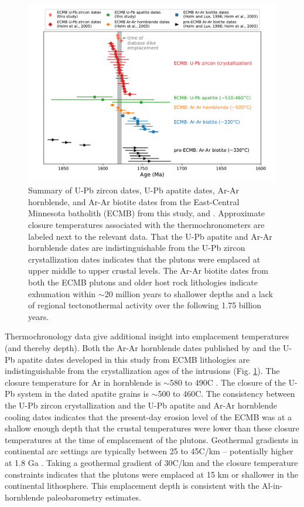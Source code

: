 \documentclass[draft]{agujournal2019}
\begin{document}
\begin{figure}[!ht]
\centering
\noindent\includegraphics[width=\textwidth]{./figures/ECMB_dates_thermochron.pdf}
\caption{\small{Summary of U-Pb zircon dates, U-Pb apatite dates, Ar-Ar hornblende, and Ar-Ar biotite dates from the East-Central Minnesota batholith (ECMB) from this study,  and . Approximate closure temperatures associated with the thermochronometers are labeled next to the relevant data. That the U-Pb apatite and Ar-Ar hornblende dates are indistinguishable from the U-Pb zircon crystallization dates indicates that the plutons were emplaced at upper middle to upper crustal levels. The Ar-Ar biotite dates from both the ECMB plutons and older host rock lithologies indicate exhumation within $\sim$20 million years to shallower depths and a lack of regional tectonothermal activity over the following 1.75 billion years.}}
\label{fig:thermochron_dates}
\end{figure}

Thermochronology data give additional insight into emplacement temperatures (and thereby depth). Both the Ar-Ar hornblende dates published by  and the U-Pb apatite dates developed in this study from ECMB lithologies are indistinguishable from the crystallization ages of the intrusions (Fig. \ref{fig:thermochron_dates}). The closure temperature for Ar in hornblende is $\sim$580 to 490\textdegree C \cite{Harrison1982a}. The closure of the U-Pb system in the dated apatite grains is $\sim$500 to 460\textdegree C. The consistency between the U-Pb zircon crystallization and the U-Pb apatite and Ar-Ar hornblende cooling dates indicates that the present-day erosion level of the ECMB was at a shallow enough depth that the crustal temperatures were lower than these closure temperatures at the time of emplacement of the plutons. Geothermal gradients in continental arc settings are typically between 25 to 45\textdegree C/km -- potentially higher at 1.8 Ga \cite{Rothstein2003a}. Taking a geothermal gradient of 30\textdegree C/km and the closure temperature constraints indicates that the plutons were emplaced at 15 km or shallower in the continental lithosphere. This emplacement depth is consistent with the Al-in-hornblende paleobarometry estimates. 
\end{document}
